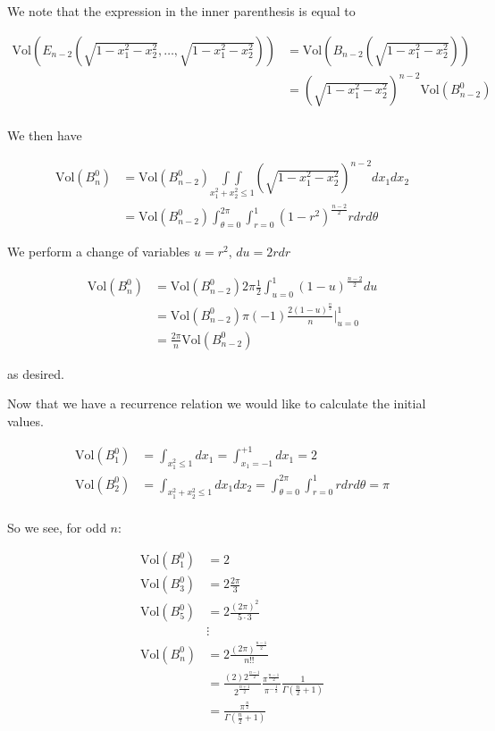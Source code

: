 \documentclass[12pt]{article}
\begin{document}
We note that the expression in the inner parenthesis is equal to 

\begin{align}
\text{Vol}\left(E_{n-2}\left(\sqrt{1-x_1^2-x_2^2},\ldots, \sqrt{1-x_1^2-x_2^2}\right)\right) &= \text{Vol}\left(B_{n-2}\left(\sqrt{1-x_1^2-x_2^2}\right)\right)\\ &= \left(\sqrt{1-x_1^2-x_2^2}\right)^{n-2}\text{Vol}(B_{n-2}^0)\\
\end{align}

We then have

\begin{align}
\text{Vol}(B_n^0) &= \text{Vol}(B_{n-2}^0) \underset{x_1^2+x_2^2\le 1}{\int\int} \left(\sqrt{1-x_1^2-x_2^2}\right)^{n-2}dx_1dx_2\\
&=  \text{Vol}(B_{n-2}^0)\int_{\theta=0}^{2\pi}\int_{r=0}^1 (1-r^2)^{\frac{n-2}{2}} r dr d\theta
\end{align}

We perform a change of variables $u=r^2$, $du = 2r dr$

\begin{align}
\text{Vol}(B_n^0) &= \text{Vol}(B_{n-2}^0) 2\pi \frac{1}{2} \int_{u=0}^1 (1-u)^{\frac{n-2}{2}} du\\
&= \text{Vol}(B_{n-2}^0)\pi (-1)\frac{2(1-u)^{\frac{n}{2}}}{n}\Big\rvert_{u=0}^1\\
&= \frac{2\pi}{n}\text{Vol}(B_{n-2}^0)
\end{align}

as desired.

Now that we have a recurrence relation we would like to calculate the initial values.

\begin{align}
\text{Vol}(B_1^0) &= \int_{x_1^2\le1}dx_1 = \int_{x_1=-1}^{+1} dx_1 = 2\\
\text{Vol}(B_2^0) &= \int_{x_1^2+x_2^2\le 1} dx_1dx_2 = \int_{\theta=0}^{2\pi}\int_{r=0}^1 r dr d\theta = \pi\\
\end{align}

So we see, for odd $n$:

\begin{align}
\text{Vol}(B_1^0) &= 2\\
\text{Vol}(B_3^0) &= 2 \frac{2\pi}{3}\\
\text{Vol}(B_5^0) &= 2 \frac{(2\pi)^2}{5\cdot3}\\
&\vdots\\
\text{Vol}(B_n^0) & = 2 \frac{(2\pi)^{\frac{n-1}{2}}}{n!!}\\
&= \frac{(2) 2^{\frac{n-1}{2}}}{2^{\frac{n+1}{2}}} \frac{\pi^{\frac{n-1}{2}}}{\pi^{-\frac{1}{2}}} \frac{1}{\Gamma\left(\frac{n}{2}+1\right)}\\
&= \frac{\pi^{\frac{n}{2}}}{\Gamma\left(\frac{n}{2}+1\right)}
\end{align}
\end{document}
